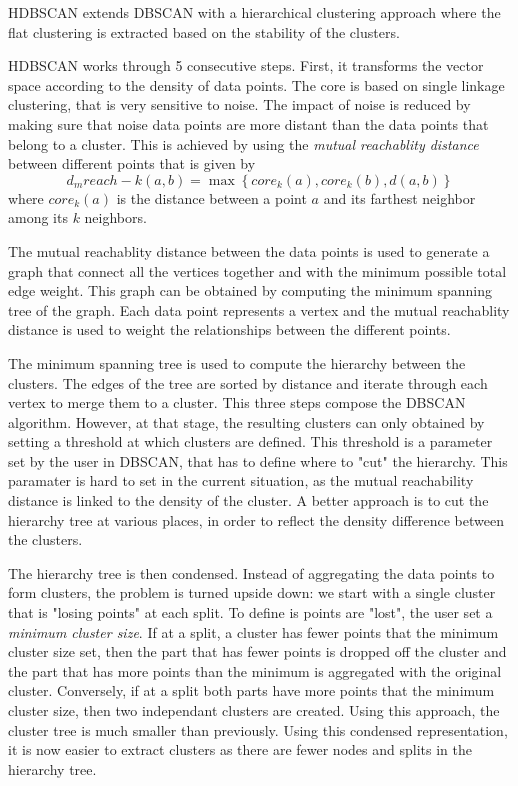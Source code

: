 HDBSCAN extends DBSCAN with a hierarchical clustering approach where the flat clustering is
extracted based on the stability of the clusters.

HDBSCAN works through 5 consecutive steps.
First, it transforms the vector space according to the density of data points.
The core is based on single linkage clustering, that is very sensitive to noise.
The impact of noise is reduced by making sure that noise data points are more distant than
the data points that belong to a cluster.
This is achieved by using the \textit{mutual reachablity distance} between different points
that is given by
\[d_mreach-k (a,b) = \max \left\{core_k (a),core_k (b),d(a,b)\right\}\]
where \(core_k(a)\) is the distance between a point \(a\) and its farthest neighbor among
its \(k\) neighbors.

The mutual reachablity distance between the data points is used to generate a graph
that connect all the vertices together and with the minimum possible total edge weight.
This graph can be obtained by computing the minimum spanning tree of the graph.
Each data point represents a vertex and the mutual reachablity distance is used to weight
the relationships between the different points.

The minimum spanning tree is used to compute the hierarchy between the clusters.
The edges of the tree are sorted by distance and iterate through each vertex to merge them to a cluster.
This three steps compose the DBSCAN algorithm.
However, at that stage, the resulting clusters can only obtained by setting a threshold
at which clusters are defined.
This threshold is a parameter set by the user in DBSCAN, that has to define where to "cut"
the hierarchy.
This paramater is hard to set in the current situation, as the mutual reachability distance
is linked to the density of the cluster.
A better approach is to cut the hierarchy tree at various places, in order to reflect the
density difference between the clusters.

The hierarchy tree is then condensed.
Instead of aggregating the data points to form clusters, the problem is turned upside down: we start
with a single cluster that is "losing points" at each split.
To define is points are "lost", the user set a \textit{minimum cluster size}.
If at a split, a cluster has fewer points that the minimum cluster size set, then the part
that has fewer points is dropped off the cluster and the part that has more points than
the minimum is aggregated with the original cluster.
Conversely, if at a split both parts have more points that the minimum cluster size, then
two independant clusters are created.
Using this approach, the cluster tree is much smaller than previously.
Using this condensed representation, it is now easier to extract clusters as there are
fewer nodes and splits in the hierarchy tree.

